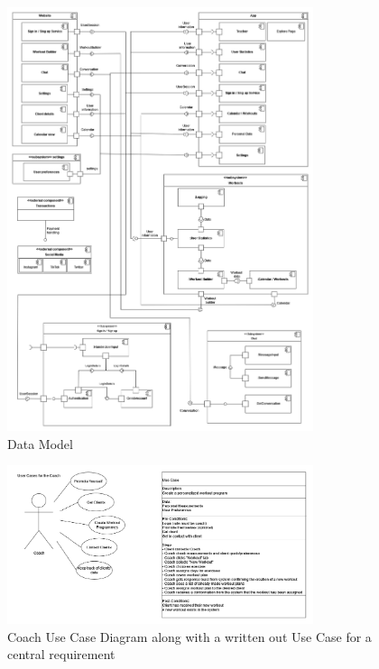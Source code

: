 \begin{figure}[H]
    \centering
    \includegraphics[width=0.8\textwidth]{images/se_data_model.png}
    \caption{Data Model}
    \label{fig:dataModel}
\end{figure}

\begin{figure}[H]
    \centering
    \includegraphics[width=0.8\textwidth]{images/use_cases.png}
    \caption{ Coach Use Case Diagram along with a written out Use Case for a central requirement }
    \label{fig:useCase}
\end{figure}


